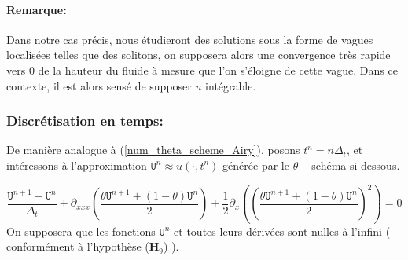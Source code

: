 \documentclass[12pt,a4paper]{article}
\numberwithin{equation}{section}
\begin{document}
\paragraph{Remarque: } Dans notre cas précis, nous étudieront des solutions sous la forme de vagues localisées telles que des solitons, on supposera alors une convergence très rapide vers 0 de la hauteur du fluide à mesure que l'on s'éloigne de cette vague. Dans ce contexte, il est alors sensé de supposer $u$ intégrable.

\subsubsection{ Discrétisation en temps: }

De manière analogue à (\ref{num_theta_scheme_Airy}), posons $t^n = n\Delta_t$, et intéressons à l'approximation $\texttt{U}^n \approx u(\cdot,t^n)$ générée par le $\theta-$schéma si dessous.

\begin{equation}
\frac{\texttt{U}^{n+1}-\texttt{U}^n}{\Delta_t} + \partial_{xxx}\left(\frac{\theta\texttt{U}^{n+1} + (1-\theta)\texttt{U}^{n}}{2}\right) + \frac{1}{2}\partial_{x}\left( \left(\frac{\theta\texttt{U}^{n+1} + (1-\theta)\texttt{U}^{n}}{2}\right)^2 \right) = 0 \label{num_theta_scheme_kdv}
\end{equation}
On supposera que les fonctions $\texttt{U}^n$ et toutes leurs dérivées sont nulles à l'infini ( conformément à l'hypothèse ($\textbf{H}_9$) ).
\end{document}
